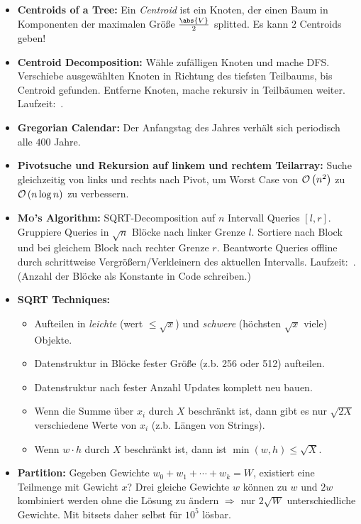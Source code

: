 \begin{itemize}
	\item \textbf{Centroids of a Tree:}
	Ein \emph{Centroid} ist ein Knoten, der einen Baum in Komponenten der maximalen Größe $\frac{\abs{V}}{2}$ splitted.
	Es kann $2$ Centroids geben!
	
	\item \textbf{Centroid Decomposition:}
	Wähle zufälligen Knoten und mache DFS.
	Verschiebe ausgewählten Knoten in Richtung des tiefsten Teilbaums, bis Centroid gefunden. Entferne Knoten, mache rekursiv in Teilbäumen weiter. Laufzeit:~.
	\item \textbf{Gregorian Calendar:} Der Anfangstag des Jahres verhält sich periodisch alle $400$ Jahre.

	\item \textbf{Pivotsuche und Rekursion auf linkem und rechtem Teilarray:}
	Suche gleichzeitig von links und rechts nach Pivot, um Worst Case von
	$\mathcal{O}\left(n^2\right)$ zu $\mathcal{O}\left(n\log n\right)$ zu verbessern.
	
	\item \textbf{\textsc{Mo}'s Algorithm:}
	SQRT-Decomposition auf $n$ Intervall Queries $[l,r]$.
	Gruppiere Queries in $\sqrt{n}$ Blöcke nach linker Grenze $l$.
	Sortiere nach Block und bei gleichem Block nach rechter Grenze $r$.
	Beantworte Queries offline durch schrittweise Vergrößern/Verkleinern des aktuellen Intervalls.
	Laufzeit:~.
	(Anzahl der Blöcke als Konstante in Code schreiben.)
	
	\item \textbf{SQRT Techniques:}
	\begin{itemize}
		\item Aufteilen in \emph{leichte} (wert $\leq\sqrt{x}$) und \emph{schwere} (höchsten $\sqrt{x}$ viele) Objekte.
		\item Datenstruktur in Blöcke fester Größe (z.b. 256 oder 512) aufteilen.
		\item Datenstruktur nach fester Anzahl Updates komplett neu bauen.
		\item Wenn die Summe über $x_i$ durch $X$ beschränkt ist, dann gibt es nur $\sqrt{2X}$ verschiedene Werte von $x_i$ (z.b. Längen von Strings).
		\item Wenn $w\cdot h$ durch $X$ beschränkt ist, dann ist $\min(w,h)\leq\sqrt{X}$.
	\end{itemize}

	\item \textbf{Partition:}
	Gegeben Gewichte $w_0+w_1+\cdots+w_k=W$, existiert eine Teilmenge mit Gewicht $x$?
	Drei gleiche Gewichte $w$ können zu $w$ und $2w$ kombiniert werden ohne die Lösung zu ändern $\Rightarrow$ nur $2\sqrt{W}$ unterschiedliche Gewichte.
	Mit bitsets daher selbst für $10^5$ lösbar.
\end{itemize}

